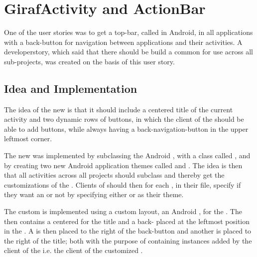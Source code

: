 \section{GirafActivity and ActionBar}
\label{sec:giraf_activity_actionbar}

One of the user stories was to get a top-bar, called  in Android, in all applications with a back-button for navigation between applications and their activities. A developerstory, which said that there should be build a common  for use across all sub-projects, was created on the basis of this user story. 

\subsection{Idea and Implementation}

The idea of the new  is that it should include a centered title of the current activity and two dynamic rows of \giraf buttons, in which the client of the  should be able to add buttons, while always having a back-navigation-button in the upper leftmost corner. 

The new  was implemented by subclassing the Android , with a class called , and by creating two new Android application themes called  and . The idea is then that all activities across all projects should subclass  and thereby get the customizations of the . Clients of  should then for each , in their  file, specify if they want an  or not by specifying either  or  as their theme.

The custom  is implemented using a custom layout, an Android , for the . The  then contains a centered  for the title and a back- placed at the leftmost position in the . A  is then placed to the right of the back-button and another  is placed to the right of the title; both with the purpose of containing  instances added by the client of the  i.e. the client of the customized . 

